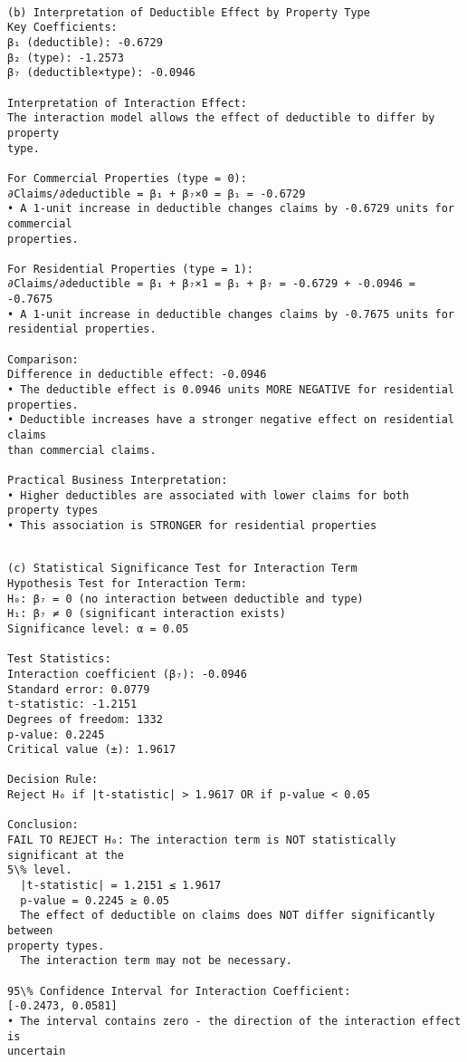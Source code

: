 \documentclass[8pt, twocolumn]{extarticle}
\begin{document}
    \begin{Verbatim}[commandchars=\\\{\}]

(b) Interpretation of Deductible Effect by Property Type
Key Coefficients:
β₁ (deductible): -0.6729
β₂ (type): -1.2573
β₇ (deductible×type): -0.0946

Interpretation of Interaction Effect:
The interaction model allows the effect of deductible to differ by property
type.

For Commercial Properties (type = 0):
∂Claims/∂deductible = β₁ + β₇×0 = β₁ = -0.6729
• A 1-unit increase in deductible changes claims by -0.6729 units for commercial
properties.

For Residential Properties (type = 1):
∂Claims/∂deductible = β₁ + β₇×1 = β₁ + β₇ = -0.6729 + -0.0946 = -0.7675
• A 1-unit increase in deductible changes claims by -0.7675 units for
residential properties.

Comparison:
Difference in deductible effect: -0.0946
• The deductible effect is 0.0946 units MORE NEGATIVE for residential
properties.
• Deductible increases have a stronger negative effect on residential claims
than commercial claims.

Practical Business Interpretation:
• Higher deductibles are associated with lower claims for both property types
• This association is STRONGER for residential properties
    \end{Verbatim}

    \begin{Verbatim}[commandchars=\\\{\}]

(c) Statistical Significance Test for Interaction Term
Hypothesis Test for Interaction Term:
H₀: β₇ = 0 (no interaction between deductible and type)
H₁: β₇ ≠ 0 (significant interaction exists)
Significance level: α = 0.05

Test Statistics:
Interaction coefficient (β₇): -0.0946
Standard error: 0.0779
t-statistic: -1.2151
Degrees of freedom: 1332
p-value: 0.2245
Critical value (±): 1.9617

Decision Rule:
Reject H₀ if |t-statistic| > 1.9617 OR if p-value < 0.05

Conclusion:
FAIL TO REJECT H₀: The interaction term is NOT statistically significant at the
5\% level.
  |t-statistic| = 1.2151 ≤ 1.9617
  p-value = 0.2245 ≥ 0.05
  The effect of deductible on claims does NOT differ significantly between
property types.
  The interaction term may not be necessary.

95\% Confidence Interval for Interaction Coefficient:
[-0.2473, 0.0581]
• The interval contains zero - the direction of the interaction effect is
uncertain
    \end{Verbatim}
\end{document}

